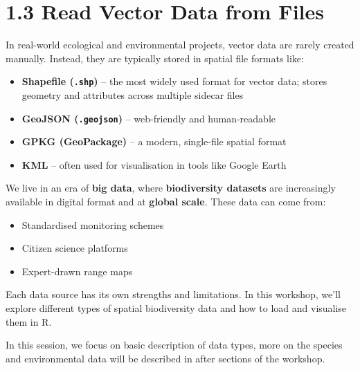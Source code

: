 \documentclass[
]{book}
\providecommand{\tightlist}{%
  \setlength{\itemsep}{0pt}\setlength{\parskip}{0pt}}
\begin{document}
\section{1.3 Read Vector Data from
Files}\label{read-vector-data-from-files}

In real-world ecological and environmental projects, vector data are
rarely created manually. Instead, they are typically stored in spatial
file formats like:

\begin{itemize}
\tightlist
\item
  \textbf{Shapefile (\texttt{.shp})} -- the most widely used format for
  vector data; stores geometry and attributes across multiple sidecar
  files
\item
  \textbf{GeoJSON (\texttt{.geojson})} -- web-friendly and
  human-readable
\item
  \textbf{GPKG (GeoPackage)} -- a modern, single-file spatial format
\item
  \textbf{KML} -- often used for visualisation in tools like Google
  Earth
\end{itemize}

\begin{tcolorbox}[enhanced jigsaw, left=2mm, bottomtitle=1mm, colframe=quarto-callout-note-color-frame, title=\textcolor{quarto-callout-note-color}{\faInfo}\hspace{0.5em}{Insight: Common sources of vector-based biodiversity data}, breakable, coltitle=black, leftrule=.75mm, bottomrule=.15mm, arc=.35mm, toprule=.15mm, colback=white, toptitle=1mm, rightrule=.15mm, titlerule=0mm, opacityback=0, colbacktitle=quarto-callout-note-color!10!white, opacitybacktitle=0.6]

We live in an era of \textbf{big data}, where \textbf{biodiversity
datasets} are increasingly available in digital format and at
\textbf{global scale}. These data can come from:

\begin{itemize}
\tightlist
\item
  Standardised monitoring schemes\\
\item
  Citizen science platforms\\
\item
  Expert-drawn range maps
\end{itemize}

Each data source has its own strengths and limitations. In this
workshop, we'll explore different types of spatial biodiversity data and
how to load and visualise them in R.

In this session, we focus on basic description of data types, more on
the species and environmental data will be described in after sections
of the workshop.

\end{tcolorbox}
\end{document}
